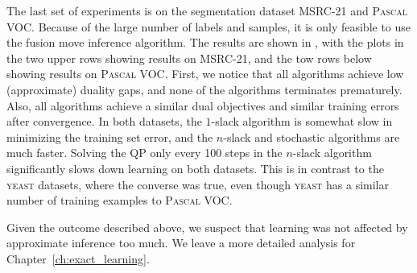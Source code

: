 The last set of experiments is on the segmentation dataset MSRC-21 and \textsc{Pascal
VOC}.  Because of the large number of labels and samples, it is only feasible
to use the fusion move inference algorithm. The results are shown in
, with the plots in the two upper rows showing results on
MSRC-21, and the tow rows below showing results on \textsc{Pascal VOC}.
First, we notice that all algorithms achieve low (approximate) duality gaps, and none
of the algorithms terminates prematurely. Also, all algorithms achieve a
similar dual objectives and similar training errors after convergence.
In both datasets, the $1$-slack algorithm is somewhat slow in minimizing the
training set error, and the $n$-slack and stochastic algorithms are much
faster. Solving the QP only every 100 steps in the $n$-slack algorithm significantly slows
down learning on both datasets. This is in contrast to the \textsc{yeast} datasets, where the converse was true,
even though \textsc{yeast} has a similar number of training examples to \textsc{Pascal VOC}.

Given the outcome described above, we suspect that learning was not affected by approximate
inference too much. We leave a more detailed analysis for Chapter~\ref{ch:exact_learning}.\pagebreak\\

